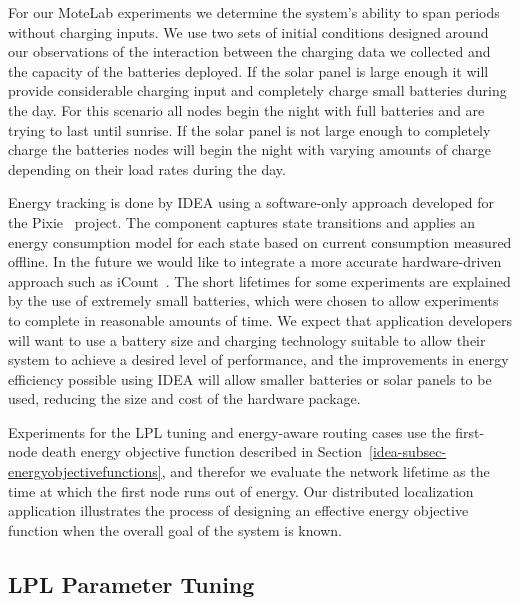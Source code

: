 For our MoteLab experiments we determine the system's ability to span periods
without charging inputs. We use two sets of initial conditions designed
around our observations of the interaction between the charging data we
collected and the capacity of the batteries deployed. If the solar panel is
large enough it will provide considerable charging input and completely
charge small batteries during the day. For this scenario all nodes begin the
night with full batteries and are trying to last until sunrise. If the solar
panel is not large enough to completely charge the batteries nodes will begin
the night with varying amounts of charge depending on their load rates during
the day.

Energy tracking is done by IDEA using a software-only approach developed for
the Pixie~\cite{pixie-sensys08} project. The component captures state
transitions and applies an energy consumption model for each state based on
current consumption measured offline. In the future we would like to
integrate a more accurate hardware-driven approach such as
iCount~\cite{icount-spots08}. The short lifetimes for some experiments are
explained by the use of extremely small batteries, which were chosen to allow
experiments to complete in reasonable amounts of time. We expect that
application developers will want to use a battery size and charging
technology suitable to allow their system to achieve a desired level of
performance, and the improvements in energy efficiency possible using IDEA
will allow smaller batteries or solar panels to be used, reducing the size
and cost of the hardware package.

Experiments for the LPL tuning and energy-aware routing cases use the
first-node death energy objective function described in
Section~\ref{idea-subsec-energyobjectivefunctions}, and therefor we evaluate
the network lifetime as the time at which the first node runs out of energy.
Our distributed localization application illustrates the process of designing
an effective energy objective function when the overall goal of the system is
known.

\subsection{LPL Parameter Tuning}
\label{idea-subsec-lplparametertuning}

